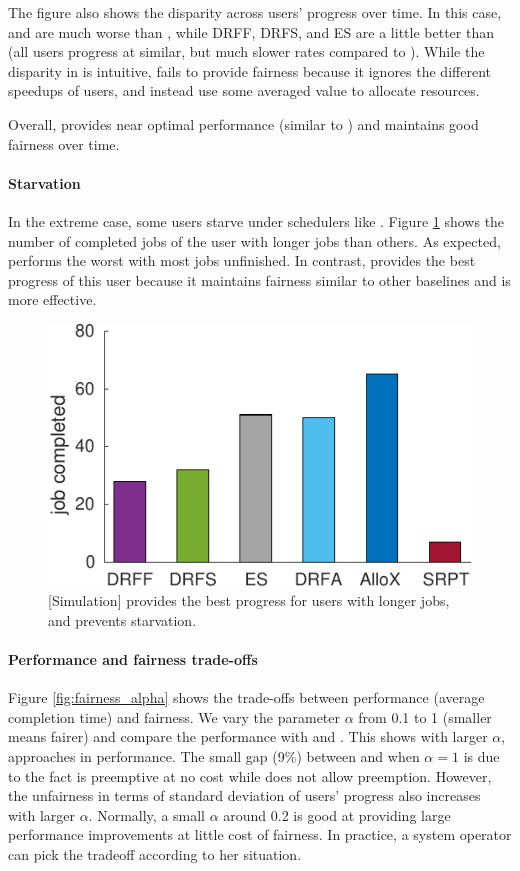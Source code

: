 The figure also shows the disparity across users' progress over time. In this case, \SRPT and \DRFExt are much worse than \name, while DRFF, DRFS, and ES are a little better than \name (all users progress at similar, but much slower rates compared to \name). 
While the disparity in \SRPT is intuitive, \DRFExt fails to provide fairness because it ignores the different speedups of users, and instead use some averaged value to allocate resources. 

Overall, \name provides near optimal performance (similar to \SRPT) and maintains good fairness over time. 

\paragraph{Starvation}

In the extreme case, some users starve under schedulers like \SRPT. 
Figure \ref{fig:job_completed} shows the number of completed jobs of the user with longer jobs than others.
As expected, \SRPT performs the worst with most jobs unfinished.
In contrast, \name provides the best progress of this user because it maintains fairness similar to other baselines and is more effective. 


\begin{figure}[h]
	\centering
	\includegraphics[width=0.7\linewidth]{figs/job_completed}  
	\caption{[Simulation] \name provides the best progress for users with longer jobs, and prevents starvation.}
	\label{fig:job_completed}
\end{figure}

\paragraph{Performance and fairness trade-offs}
\label{sec:tradeoffs}

Figure \ref{fig:fairness_alpha} shows the trade-offs between performance (average completion time) and fairness. 
We vary the parameter $\alpha$ from 0.1 to 1 (smaller means fairer) and compare the performance with \ESRP and \SRPT.
This shows with larger $\alpha$, \name approaches \SRPT in performance. The small gap (9\%) between \name and \SRPT when $\alpha=1$ is due to the fact \SRPT is preemptive at no cost while \name does not allow preemption. 
However, the unfairness in terms of standard deviation of users' progress also increases with larger $\alpha$. Normally, a small $\alpha$ around 0.2 is good at providing large performance improvements at little cost of fairness. 
In practice, a system operator can pick the tradeoff according to her situation. 



